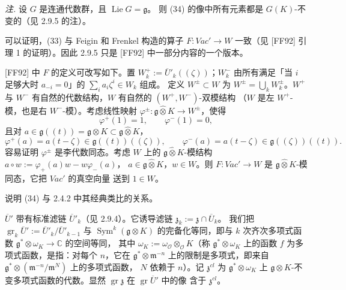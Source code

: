 \emph{注.} 设 $G$ 是连通代数群，且 $\operatorname{Lie}G=\mathfrak{g}$。
则 (34) 的像中所有元素都是 $G(K)$-不变的（见 2.9.5 的注）。


 可以证明，(33) 与 Feigin 和 Frenkel 构造的算子
$F:\mathit{Vac}'\to W$ 一致（见 [FF92] 引理 1 的证明）。因此 2.9.5
只是 [FF92] 中一部分内容的一个版本。

[FF92] 中 $F$ 的定义可改写如下。置
$W_k^+:=\overline{U}'_k((\zeta))$；$W_k^-$ 由所有满足「当 $i$ 足够大时
$a_{-i}=0$」的 $\sum_i a_i\zeta^i\in W_k$ 组成。
定义 $W^\pm\subset W$ 为 $W^\pm=\bigcup_k W_k^\pm$。$W^+$ 与 $W^-$
有自然的代数结构，$W$ 有自然的 $(W^+,W^-)$-双模结构
（$W$ 是左 $W^+$-模，也是右 $W^-$-模）。考虑线性映射
$\varphi^\pm:\mathfrak{g}\widehat{\otimes}K\to W^\pm$，使得
\[
\varphi^+(1)=1,\qquad \varphi^-(1)=0,
\]
且对 $a\in\mathfrak{g}((t))=\mathfrak{g}\otimes K
\subset\mathfrak{g}\widehat{\otimes}K$，
\[
\varphi^+(a)=a(t-\zeta)\in\mathfrak{g}((t))((\zeta)),\qquad
\varphi^-(a)=a(t-\zeta)\in\mathfrak{g}((\zeta))((t)).
\]
容易证明 $\varphi^\pm$ 是李代数同态。考虑 $W$ 上的
$\mathfrak{g}\widehat{\otimes}K$-模结构
$a\circ w:=\varphi_+(a)w-w\varphi_-(a)$，
$a\in\mathfrak{g}\widehat{\otimes}K$，$w\in W$。则 $F:\mathit{Vac}'\to W$
是 $\mathfrak{g}\widehat{\otimes}K$-模同态，它把 $\mathit{Vac}'$ 的真空向量
送到 $1\in W$。

 说明 (34) 与 2.4.2 中其经典类比的关系。

$\overline{U}'$ 带有标准滤链 $\overline{U}'_k$（见 2.9.4）。它诱导滤链
$\mathfrak{z}_k:=\mathfrak{z}\cap\overline{U}_k$。
我们把 $\operatorname{gr}_k\overline{U}':=
\overline{U}'_k/\overline{U}'_{k-1}$ 与
$\operatorname{Sym}^k(\mathfrak{g}\otimes K)$ 的完备化等同，即与 $k$
次齐次多项式函数 $\mathfrak{g}^*\otimes\omega_K\to\mathbb{C}$ 的空间等同，
其中 $\omega_K:=\omega_{\mathcal{O}}\otimes_{\mathcal{O}}K$（称
$\mathfrak{g}^*\otimes\omega_K$ 上的函数 $f$ 为多项式函数，是指：对每个
$n$，它在 $\mathfrak{g}^*\otimes\mathfrak{m}^{-n}$ 上的限制是多项式，即来自
$\mathfrak{g}^*\otimes(\mathfrak{m}^{-n}/\mathfrak{m}^N)$ 上的多项式函数，
$N$ 依赖于 $n$）。记 $\mathfrak{z}^{cl}$ 为 $\mathfrak{g}^*\otimes\omega_K$ 上
$\mathfrak{g}\otimes K$-不变多项式函数的代数。显然
$\operatorname{gr}\mathfrak{z}$ 在 $\operatorname{gr}\overline{U}'$ 中的像
含于 $\mathfrak{z}^{cl}$。


